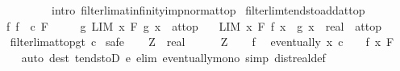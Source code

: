 \begin{isabellebody}
\ \ \ \ \ \ \ \ \ \ \ intro{\isacharcolon}{\kern0pt}\ filterlim{\isacharunderscore}{\kern0pt}at{\isacharunderscore}{\kern0pt}infinity{\isacharunderscore}{\kern0pt}imp{\isacharunderscore}{\kern0pt}norm{\isacharunderscore}{\kern0pt}at{\isacharunderscore}{\kern0pt}top{\isacharparenright}{\kern0pt}%
\endisatagproof
{\isafoldproof}%
%
\isadelimproof
\isanewline
%
\endisadelimproof
\isanewline
{}\isamarkupfalse%
\ filterlim{\isacharunderscore}{\kern0pt}tendsto{\isacharunderscore}{\kern0pt}add{\isacharunderscore}{\kern0pt}at{\isacharunderscore}{\kern0pt}top{\isacharcolon}{\kern0pt}\isanewline
\ \ \ f{\isacharcolon}{\kern0pt}\ {\isachardoublequoteopen}{\isacharparenleft}{\kern0pt}f\ {\isasymlonglongrightarrow}\ c{\isacharparenright}{\kern0pt}\ F{\isachardoublequoteclose}\isanewline
\ \ \ \ \ g{\isacharcolon}{\kern0pt}\ {\isachardoublequoteopen}LIM\ x\ F{\isachardot}{\kern0pt}\ g\ x\ {\isacharcolon}{\kern0pt}{\isachargreater}{\kern0pt}\ at{\isacharunderscore}{\kern0pt}top{\isachardoublequoteclose}\isanewline
\ \ \ {\isachardoublequoteopen}LIM\ x\ F{\isachardot}{\kern0pt}\ {\isacharparenleft}{\kern0pt}f\ x\ {\isacharplus}{\kern0pt}\ g\ x\ {\isacharcolon}{\kern0pt}{\isacharcolon}{\kern0pt}\ real{\isacharparenright}{\kern0pt}\ {\isacharcolon}{\kern0pt}{\isachargreater}{\kern0pt}\ at{\isacharunderscore}{\kern0pt}top{\isachardoublequoteclose}\isanewline
%
\isadelimproof
\ \ %
\endisadelimproof
%
\isatagproof
{}\isamarkupfalse%
\ filterlim{\isacharunderscore}{\kern0pt}at{\isacharunderscore}{\kern0pt}top{\isacharunderscore}{\kern0pt}gt{\isacharbrackleft}{\kern0pt}\ c{\isacharequal}{\kern0pt}{}{\isacharbrackright}{\kern0pt}\isanewline
{}\isamarkupfalse%
\ safe\isanewline
\ \ \isamarkupfalse%
\ Z\ {\isacharcolon}{\kern0pt}{\isacharcolon}{\kern0pt}\ real\isanewline
\ \ \isamarkupfalse%
\ {\isachardoublequoteopen}{}\ {\isacharless}{\kern0pt}\ Z{\isachardoublequoteclose}\isanewline
\ \ \isamarkupfalse%
\ f\ \isamarkupfalse%
\ {\isachardoublequoteopen}eventually\ {\isacharparenleft}{\kern0pt}{\isasymlambda}x{\isachardot}{\kern0pt}\ c\ {\isacharminus}{\kern0pt}\ {}\ {\isacharless}{\kern0pt}\ f\ x{\isacharparenright}{\kern0pt}\ F{\isachardoublequoteclose}\isanewline
\ \ \ \ \isamarkupfalse%
\ {\isacharparenleft}{\kern0pt}auto\ dest{\isacharbang}{\kern0pt}{\isacharcolon}{\kern0pt}\ tendstoD{\isacharbrackleft}{\kern0pt}\ e{\isacharequal}{\kern0pt}{}{\isacharbrackright}{\kern0pt}\ elim{\isacharbang}{\kern0pt}{\isacharcolon}{\kern0pt}\ eventually{\isacharunderscore}{\kern0pt}mono\ simp{\isacharcolon}{\kern0pt}\ dist{\isacharunderscore}{\kern0pt}real{\isacharunderscore}{\kern0pt}def{\isacharparenright}{\kern0pt}\isanewline

\end{isabellebody}
